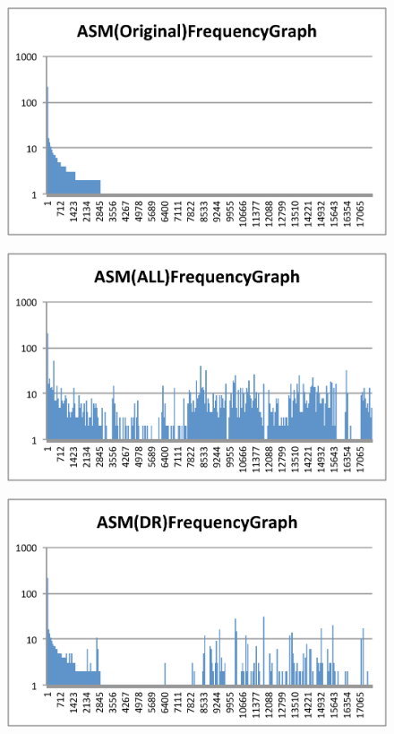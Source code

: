 \documentclass[conference]{IEEEtran}
\begin{document}
\begin{figure}[bt]
  \centering
  \begin{minipage}[b]{0.48\linewidth}
    \includegraphics[clip,width=1.0\columnwidth]{images/ORI}%
    \label{fig:asm-5gram-original-histogram}%
  \end{minipage}
  \begin{minipage}[b]{0.48\linewidth}
    \includegraphics[clip,width=1.0\columnwidth]{images/ALL}%
    \label{fig:asm-5gram-ALL-histogram}%
  \end{minipage}\vspace{0.5cm}
  \begin{minipage}[b]{0.48\linewidth}
    \includegraphics[clip,width=1.0\columnwidth]{images/DR}%

\end{minipage}
\end{figure}
\end{document}
